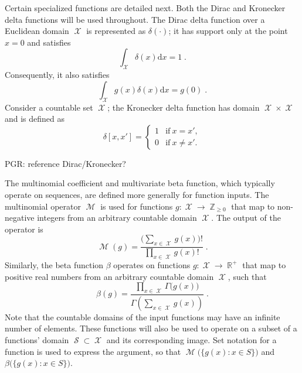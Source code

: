 \documentclass[12pt]{report}
\DeclareMathOperator{\Xcal}{\mathcal{X}}
\DeclareMathOperator{\Mcal}{\mathcal{M}}
\DeclareMathOperator{\Scal}{\mathcal{S}}
\DeclareMathOperator{\Rbb}{\mathbb{R}}
\DeclareMathOperator{\Zbb}{\mathbb{Z}}
\begin{document}
Certain specialized functions are detailed next. Both the Dirac and Kronecker delta functions will be used throughout. The Dirac delta function over a Euclidean domain $\Xcal$ is represented as $\delta(\cdot)$; it has support only at the point $x=0$ and satisfies
\begin{equation}
\int_{\Xcal} \delta(x) \mathrm{d}x = 1 \;.
\end{equation}
Consequently, it also satisfies
\begin{equation}
\int_{\Xcal} g(x) \delta(x) \mathrm{d}x = g(0) \;.
\end{equation}
Consider a countable set $\Xcal$; the Kronecker delta function has domain $\Xcal \times \Xcal$ and is defined as
\begin{equation}
\delta[x,x'] = \begin{cases} 1 & \mathrm{if} \ x = x', \\ 0 & \mathrm{if} \ x \neq x'.  \end{cases}
\end{equation}

PGR: reference Dirac/Kronecker?


The multinomial coefficient and multivariate beta function, which typically operate on sequences, are defined more generally for function inputs. The multinomial operator $\Mcal$ is used for functions $g : \Xcal \to \Zbb_{\geq 0}$ that map to non-negative integers from an arbitrary countable domain $\Xcal$. The output of the operator is
\begin{equation}
\Mcal(g) = \frac{\big( \sum_{x \in \Xcal} g(x) \big)!}{\prod_{x \in \Xcal} g(x)!} \;.
\end{equation}
Similarly, the beta function $\beta$ operates on functions $g : \Xcal \to \Rbb^+$ that map to positive real numbers from an arbitrary countable domain $\Xcal$, such that
\begin{equation}
\beta(g) = \frac{\prod_{x \in \Xcal} \Gamma\big( g(x) \big)}{\Gamma \left( \sum_{x \in \Xcal} g(x) \right)} \;.
\end{equation}
Note that the countable domains of the input functions may have an infinite number of elements. These functions will also be used to operate on a subset of a functions' domain $\Scal \subset \Xcal$ and its corresponding image. Set notation for a function is used to express the argument, so that $\Mcal\Big( \big\{ g(x) : x \in S \big\} \Big)$ and $\beta\Big( \big\{ g(x) : x \in S \big\} \Big)$.
\end{document}
